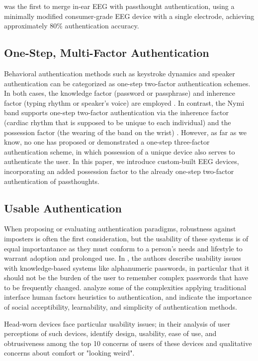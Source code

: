 \documentclass{sigchi}
\begin{document}
\cite{curran2016passthoughts} was the first to merge in-ear EEG with passthought authentication,
 using a minimally modified consumer-grade EEG device with a single electrode, achieving approximately 80\% authentication accuracy.

\subsection{One-Step, Multi-Factor Authentication}
Behavioral authentication methods such as keystroke dynamics and speaker authentication can be categorized as one-step two-factor authentication schemes. In both cases, the knowledge factor (password or passphrase) and inherence factor (typing rhythm or speaker's voice) are employed \cite{Monrose1997}. In contrast, the Nymi band supports one-step two-factor authentication via the inherence factor (cardiac rhythm that is supposed to be unique to each individual) and the possession factor (the wearing of the band on the wrist) \cite{Nymi}. However, as far as we know, no one has proposed or demonstrated a one-step three-factor authentication scheme, in which possession of a unique device also serves to authenticate the user. In this paper, we introduce custom-built EEG devices, incorporating an added possession factor to the already one-step two-factor authentication of passthoughts.

\subsection{Usable Authentication}

When proposing or evaluating authentication paradigms, robustness against imposters is often the first consideration, but the usability of these systems is of equal importantance as they must conform to a person's needs and lifestyle to warrant adoption and prolonged use. In \cite{sasse2001}, the authors describe usability issues with knowledge-based systems like alphanumeric passwords, in particular that it should not be the burden of the user to remember complex passwords that have to be frequently changed. \cite{braz2006} analyze some of the complexities applying traditional interface human factors heuristics to authentication, and indicate the importance of social acceptibility, learnability, and simplicity of authentication methods.

Head-worn devices face particular usability issues; in their analysis of user perceptions of such devices, \cite{Genaro2014} identify design, usability, ease of use, and obtrusiveness among the top 10 concerns of users of these devices and qualitative concerns about comfort or "looking weird".
\end{document}
